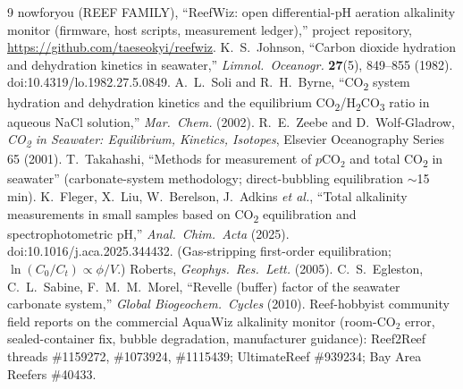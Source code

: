 \documentclass[11pt]{article}
\newcommand{\co}{\ensuremath{\mathrm{CO_2}}}
\begin{document}
\begin{thebibliography}{9}
 nowforyou (REEF FAMILY), ``ReefWiz: open differential-pH
aeration alkalinity monitor (firmware, host scripts, measurement ledger),''
project repository, \url{https://github.com/taeseokyi/reefwiz}.
 K.~S.~Johnson, ``Carbon dioxide hydration and dehydration
kinetics in seawater,'' \emph{Limnol.\ Oceanogr.} \textbf{27}(5), 849--855
(1982). doi:10.4319/lo.1982.27.5.0849.
 A.~L.~Soli and R.~H.~Byrne, ``CO\textsubscript{2} system
hydration and dehydration kinetics and the equilibrium CO\textsubscript{2}/H\textsubscript{2}CO\textsubscript{3}
ratio in aqueous NaCl solution,'' \emph{Mar.\ Chem.} (2002).
 R.~E.~Zeebe and D.~Wolf-Gladrow, \emph{CO\textsubscript{2}
in Seawater: Equilibrium, Kinetics, Isotopes}, Elsevier Oceanography Series 65
(2001).
 T.~Takahashi, ``Methods for measurement of
$p\mathrm{CO_2}$ and total CO\textsubscript{2} in seawater'' (carbonate-system
methodology; direct-bubbling equilibration $\sim$15\,min).
 K.~Fleger, X.~Liu, W.~Berelson, J.~Adkins \emph{et al.},
``Total alkalinity measurements in small samples based on
CO\textsubscript{2} equilibration and spectrophotometric pH,''
\emph{Anal.\ Chim.\ Acta} (2025). doi:10.1016/j.aca.2025.344432.
 (Gas-stripping first-order equilibration;
$\ln(C_0/C_t)\propto \phi/V$.) Roberts, \emph{Geophys.\ Res.\ Lett.} (2005).
 C.~S.~Egleston, C.~L.~Sabine, F.~M.~M.~Morel,
``Revelle (buffer) factor of the seawater carbonate system,''
\emph{Global Biogeochem.\ Cycles} (2010).
 Reef-hobbyist community field reports on the commercial
AquaWiz alkalinity monitor (room-\co{} error, sealed-container fix, bubble
degradation, manufacturer guidance): Reef2Reef threads \#1159272, \#1073924,
\#1115439; UltimateReef \#939234; Bay Area Reefers \#40433.
\end{thebibliography}
\end{document}
